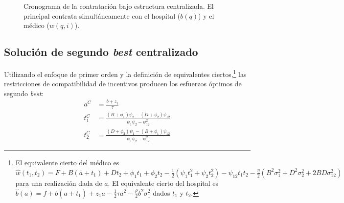 \documentclass[12pt, a4paper, twoside, openright]{book}
\theoremstyle{plain}
\theoremstyle{definition}
\theoremstyle{remark}
\begin{document}
\begin{figure}[htbp]
\centering
{}%
\caption{Cronograma de la contratación bajo estructura centralizada.
  El principal contrata simultáneamente con el hospital ($b(q)$)
  y el médico ($w(q,i)$).}
\label{fig:cronograma_c}
\end{figure}
\subsection{Solución de segundo \texorpdfstring{\textit{best}}{best} centralizado}

Utilizando el enfoque de primer orden y la definición de equivalentes ciertos,\footnote{El equivalente cierto del médico es $\widehat{w}(t_1,t_2)=F+B(\bar{a}+t_1)+Dt_2+\phi_1t_1+\phi_2t_2-\frac{1}{2}(\psi_1t_1^2+\psi_2t_2^2)-\psi_{12}t_1t_2-\frac{\eta}{2}(B^2\sigma_1^2+D^2\sigma_2^2+2BD\sigma_{12}^2)$ para una realización dada de $a$. El equivalente cierto del hospital es $\widehat{b}(a)=f+b(a+\bar{t}_1)+z_1a-\frac{1}{2}\tau a^2-\frac{\rho}{2}b^2\sigma_1^2$ dados $t_1$ y $t_2$.} las restricciones de compatibilidad de incentivos producen los esfuerzos óptimos de segundo \textit{best}:
\begin{align}
  a^{C} &= \frac{b+z_1}{\tau} \label{eq:a_sb}\\
  t_1^{C} &= \frac{(B+\phi_1)\psi_2-(D+\phi_2)\psi_{12}}{\psi_1\psi_2-\psi_{12}^2} \label{eq:t1_sb}\\
  t_2^{C} &= \frac{(D+\phi_2)\psi_1-(B+\phi_1)\psi_{12}}{\psi_1\psi_2-\psi_{12}^2} \label{eq:t2_sb}
\end{align}
\end{document}
